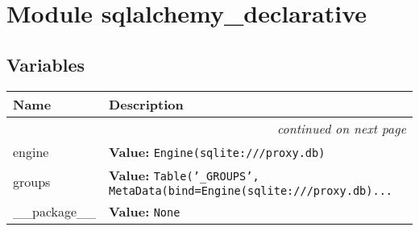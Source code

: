 %
%
%


\section{Module sqlalchemy\_declarative}

    \label{sqlalchemy_declarative}


  \subsection{Variables}

    \vspace{-1cm}
\hspace{\varindent}\begin{longtable}{|p{\varnamewidth}|p{\vardescrwidth}|l}
\cline{1-2}
\cline{1-2} \centering \textbf{Name} & \centering \textbf{Description}& \\
\cline{1-2}
\endhead\cline{1-2}\multicolumn{3}{r}{\small\textit{continued on next page}}\\\endfoot\cline{1-2}
\endlastfoot\raggedright e\-n\-g\-i\-n\-e\- & \raggedright \textbf{Value:} 
{\tt Engine(sqlite:///proxy.db)}&\\
\cline{1-2}
\raggedright g\-r\-o\-u\-p\-s\- & \raggedright \textbf{Value:} 
{\tt Table('\_GROUPS', MetaData(bind=Engine(sqlite:///proxy.db)\texttt{...}}&\\
\cline{1-2}
\raggedright \_\-\_\-p\-a\-c\-k\-a\-g\-e\-\_\-\_\- & \raggedright \textbf{Value:} 
{\tt None}&\\
\cline{1-2}
\end{longtable}



